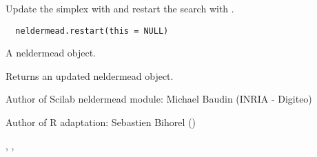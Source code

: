 %
\begin{Description}\relax
Update the simplex with  and restart the search
with .
\end{Description}
%
\begin{Usage}
\begin{verbatim}
  neldermead.restart(this = NULL)
\end{verbatim}
\end{Usage}
%
\begin{Arguments}
\begin{ldescription}
\item[\code{this}] A neldermead object.
\end{ldescription}
\end{Arguments}
%
\begin{Value}
Returns an updated neldermead object.
\end{Value}
%
\begin{Author}\relax
Author of Scilab neldermead module: Michael Baudin (INRIA - Digiteo)

Author of R adaptation: Sebastien Bihorel ()
\end{Author}
%
\begin{SeeAlso}\relax
{},
,
\end{SeeAlso}
